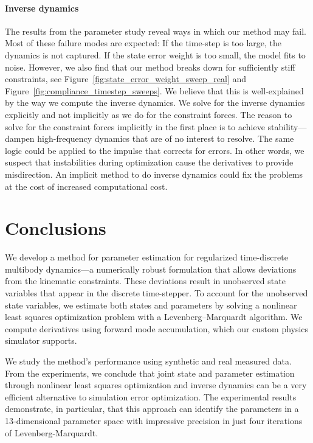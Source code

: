 \documentclass[preprint,12pt]{elsarticle}
\newcommand\figref{Figure~\ref}
\numberwithin{equation}{section}
\begin{document}
\paragraph{Inverse dynamics}
The results from the parameter study reveal ways in which our method may fail. Most of these failure modes are expected: If the time-step is too large, the dynamics is not captured. 
If the state error weight is too small, the model fits to noise. However, we also find that our method breaks down for sufficiently stiff constraints, see \figref{fig:state_error_weight_sweep_real} and \figref{fig:compliance_timestep_sweeps}.
We believe that this is well-explained by the way we compute the inverse dynamics. 
We solve for the inverse dynamics explicitly and not implicitly as we do for the constraint forces.
The reason to solve for the constraint forces implicitly in the first place is to achieve stability---dampen high-frequency dynamics that are of no interest to resolve.
The same logic could be applied to the impulse that corrects for errors.
In other words, we suspect that instabilities during optimization cause the derivatives to provide misdirection. An implicit method to do inverse dynamics could fix the problems at the cost of increased computational cost.


\section{Conclusions}
\label{sec:conclusions}
We develop a method for parameter estimation for regularized time-discrete multibody dynamics---a numerically robust formulation that allows deviations from the kinematic constraints.
These deviations result in unobserved state variables that appear in the discrete time-stepper.
To account for the unobserved state variables, we estimate both states and parameters by solving a nonlinear least squares optimization problem with a Levenberg--Marquardt algorithm.
We compute derivatives using forward mode accumulation, which our custom physics simulator supports.

We study the method's performance using synthetic and real measured data.
From the experiments, we conclude that joint state and parameter estimation through nonlinear least squares optimization and inverse dynamics can be a very efficient alternative to simulation error optimization.
The experimental results demonstrate, in particular, that this approach can identify the parameters in a 13-dimensional parameter space with impressive precision in just four iterations of Levenberg-Marquardt.
\end{document}

